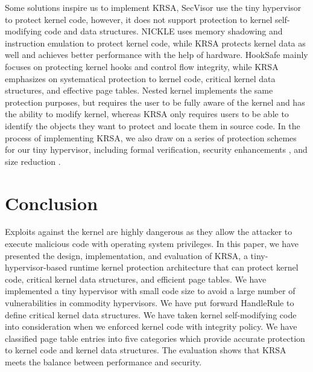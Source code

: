 \documentclass[conference]{IEEEtran}
\begin{document}
Some solutions inspire us to implement KRSA, SecVisor \cite{secvisor} use the tiny hypervisor to protect kernel code, however, it does not support protection to kernel self-modifying code and data structures. 
NICKLE\cite{vmmshadow} uses memory shadowing and instruction emulation to protect kernel code, while KRSA protects kernel data as well and achieves better performance with the help of hardware. HookSafe\cite{hooksafe} mainly focuses on protecting kernel hooks and control flow integrity, while KRSA emphasizes on systematical protection to kernel code, critical kernel data structures, and effective page tables. 
Nested kernel\cite{nest15} implements the same protection purposes, but requires the user to be fully aware of the kernel and has the ability to modify kernel, whereas KRSA only requires users to be able to identify the objects they want to protect and locate them in source code. In the process of implementing KRSA, we also draw on a series of protection schemes for our tiny hypervisor, including formal verification\cite{sel413}, 
security enhancements%
\cite{hypersentry,hyperSafe}, and size reduction \cite{break,seccloud}.



\section{Conclusion}

Exploits against the kernel are highly dangerous as they allow the attacker to execute malicious code with operating system privileges. In this paper, we have presented the design, implementation, and evaluation of KRSA, a tiny-hypervisor-based runtime kernel protection architecture that can protect kernel code, critical kernel data structures, and efficient page tables. We have implemented a tiny hypervisor with small code size to avoid a large number of vulnerabilities in commodity hypervisors. We have put forward HandleRule to define critical kernel data structures. 
We have taken kernel self-modifying code into consideration when we enforced kernel code with integrity policy. We have classified page table entries into five categories which provide accurate protection to kernel code and kernel data structures. The evaluation shows that KRSA meets the balance between performance and security. 
\end{document}
